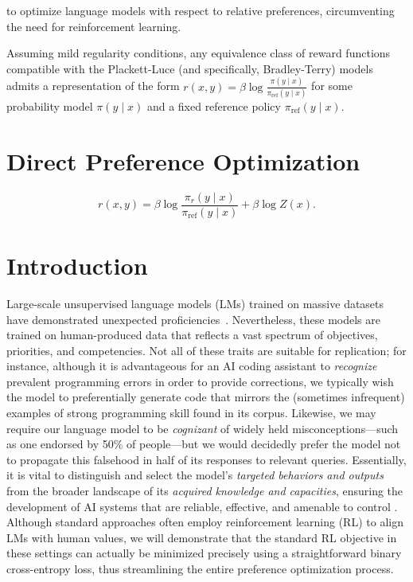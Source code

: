 to optimize language models with respect to relative preferences, circumventing the need for reinforcement learning.

\begin{theorem}\label{thm:main}
    Assuming mild regularity conditions, any equivalence class of reward functions compatible with the Plackett-Luce (and specifically, Bradley-Terry) models admits a representation of the form ${r(x, y) = \beta \log \frac{\pi(y\mid x)}{\pi_\text{ref}(y\mid x)}}$ for some probability model $\pi(y\mid x)$ and a fixed reference policy $\pi_\text{ref}(y \mid x)$.
\end{theorem}

\section{Direct Preference Optimization}\label{sec:DPO}

\begin{equation}\label{eq:main_eq}
    r(x,y) =\beta \log \frac{\pi_r(y\mid x)}{\pi_\text{ref}(y\mid x)} + \beta \log Z(x).
\end{equation}

\section{Introduction}
Large-scale unsupervised language models (LMs) trained on massive datasets have demonstrated unexpected proficiencies~\citep{chowdhery2022palm, brown2020language, touvron2023llama,bubeck2023sparks}. Nevertheless, these models are trained on human-produced data that reflects a vast spectrum of objectives, priorities, and competencies. Not all of these traits are suitable for replication; for instance, although it is advantageous for an AI coding assistant to \textit{recognize} prevalent programming errors in order to provide corrections, we typically wish the model to preferentially generate code that mirrors the (sometimes infrequent) examples of strong programming skill found in its corpus. Likewise, we may require our language model to be \textit{cognizant} of widely held misconceptions—such as one endorsed by 50\% of people—but we would decidedly prefer the model not to propagate this falsehood in half of its responses to relevant queries. Essentially, it is vital to distinguish and select the model's \emph{targeted behaviors and outputs} from the broader landscape of its \textit{acquired knowledge and capacities}, ensuring the development of AI systems that are reliable, effective, and amenable to control \citep{ouyang2022training}. Although standard approaches often employ reinforcement learning (RL) to align LMs with human values, we will demonstrate that the standard RL objective in these settings can actually be minimized precisely using a straightforward binary cross-entropy loss, thus streamlining the entire preference optimization process.

